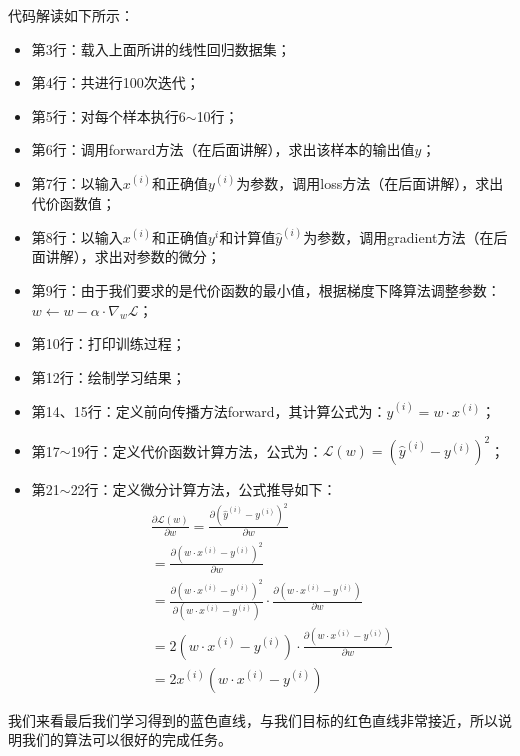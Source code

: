 \documentclass[UTF8]{article}
\begin{document}
代码解读如下所示：
\begin{itemize}
\item 第3行：载入上面所讲的线性回归数据集；
\item 第4行：共进行100次迭代；
\item 第5行：对每个样本执行6$\sim$10行；
\item 第6行：调用forward方法（在后面讲解），求出该样本的输出值$\hat{y}$；
\item 第7行：以输入$x^{(i)}$和正确值$y^{(i)}$为参数，调用loss方法（在后面讲解），求出代价函数值；
\item 第8行：以输入$x^{(i)}$和正确值$y^{i}$和计算值$\hat{y}^{(i)}$为参数，调用gradient方法（在后面讲解），求出对参数的微分；
\item 第9行：由于我们要求的是代价函数的最小值，根据梯度下降算法调整参数：$w \leftarrow w - \alpha \cdot \nabla_{w} \mathcal{L}$；
\item 第10行：打印训练过程；
\item 第12行：绘制学习结果；
\item 第14、15行：定义前向传播方法forward，其计算公式为：$\hat{y}^{(i)} = w \cdot x^{(i)}$；
\item 第17$\sim$19行：定义代价函数计算方法，公式为：$\mathcal{L}(w) = (\hat{y}^{(i)} - y^{(i)})^{2}$；
\item 第21$\sim$22行：定义微分计算方法，公式推导如下：
\begin{equation}
\begin{aligned}
\frac{ \partial{ \mathcal{L}(w) } }{ \partial{w} } = \frac{ \partial{ (\hat{y}^{(i)} - y^{(i)})^{2} } }{ \partial{w} } \\
= \frac{ \partial{ (w \cdot x^{(i)} - y^{(i)})^{2} } }{ \partial{w} } \\
= \frac{ \partial{ (w \cdot x^{(i)} - y^{(i)})^{2} } } { \partial{ (w \cdot x^{(i)} - y^{(i)}) } } \cdot \frac{ \partial{ (w \cdot x^{(i)} - y^{(i)}) } }      { \partial{w} } \\
= 2 (w \cdot x^{(i)} - y^{(i)}) \cdot \frac{ \partial{(w \cdot x^{(i)} - y^{(i)})}}{\partial{w}} \\
= 2 x^{(i)}(w \cdot x^{(i)} - y^{(i)})
\end{aligned}
\label{autodiff-numpy-mse-gradient}
\end{equation}
\end{itemize}
我们来看最后我们学习得到的蓝色直线，与我们目标的红色直线非常接近，所以说明我们的算法可以很好的完成任务。
\end{document}
